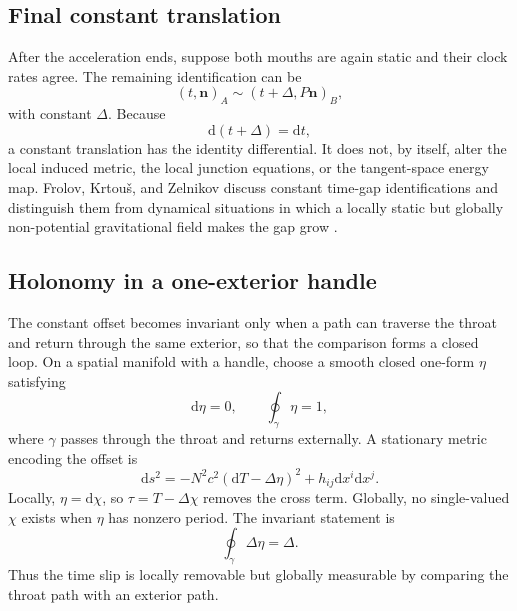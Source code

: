 \documentclass[journal,a4paper]{IEEEtran}
\begin{document}
\subsection{Final constant translation}

After the acceleration ends, suppose both mouths are again static and their clock rates agree. The remaining identification can be
\begin{equation}
    \boxed{
    (t,\mathbf n)_A
    \sim
    (t+\Delta,P\mathbf n)_B,
    }
    \label{eq:time_shift_identification}
\end{equation}
with constant \(\Delta\). Because
\begin{equation}
    \mathrm{d}(t+\Delta)=\mathrm{d}t,
\end{equation}
a constant translation has the identity differential. It does not, by itself, alter the local induced metric, the local junction equations, or the tangent-space energy map. Frolov, Krtou\v{s}, and Zelnikov discuss constant time-gap identifications and distinguish them from dynamical situations in which a locally static but globally non-potential gravitational field makes the gap grow \cite{Frolov2023}.

\subsection{Holonomy in a one-exterior handle}

The constant offset becomes invariant only when a path can traverse the throat and return through the same exterior, so that the comparison forms a closed loop. On a spatial manifold with a handle, choose a smooth closed one-form \(\eta\) satisfying
\begin{equation}
    \mathrm{d}\eta=0,
    \qquad
    \oint_\gamma\eta=1,
\end{equation}
where \(\gamma\) passes through the throat and returns externally. A stationary metric encoding the offset is
\begin{equation}
    \boxed{
    \mathrm{d}s^2
    =-N^2c^2(\mathrm{d}T-\Delta\eta)^2
    +h_{ij}\mathrm{d}x^i\mathrm{d}x^j.
    }
    \label{eq:holonomy_metric}
\end{equation}
Locally, \(\eta=\mathrm{d}\chi\), so \(\tau=T-\Delta\chi\) removes the cross term. Globally, no single-valued \(\chi\) exists when \(\eta\) has nonzero period. The invariant statement is
\begin{equation}
    \oint_\gamma\Delta\eta=\Delta.
\end{equation}
Thus the time slip is locally removable but globally measurable by comparing the throat path with an exterior path.
\end{document}
